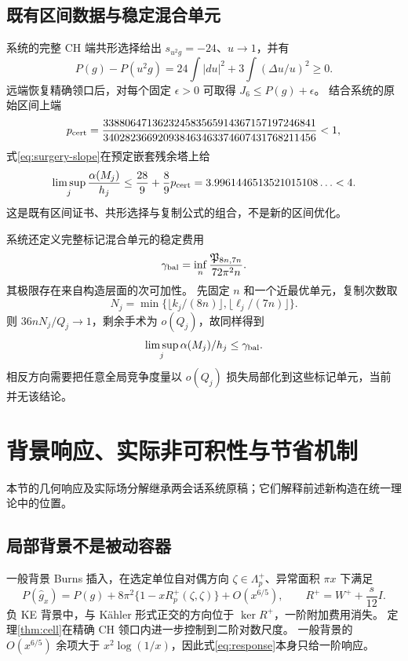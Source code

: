 \documentclass[UTF8,11pt,a4paper,fontset=none]{ctexart}
\numberwithin{equation}{section}
\theoremstyle{definition}
\theoremstyle{remark}\newtheorem{remark}[theorem]{说明}
\begin{document}
\subsection{既有区间数据与稳定混合单元}
系统的完整 CH 端共形选择\cite{Conformal}给出 $s_{u^2g}=-24$、$u\to1$，并有
\[
P(g)-P(u^2g)=24\int|du|^2+3\int(\Delta u/u)^2\ge0.
\]
远端恢复精确领口后，对每个固定 $\epsilon>0$ 可取得 $J_6\le P(g)+\epsilon$。
结合系统的原始区间上端
\[
p_{\rm cert}=
\frac{338806471362324583565914367157197246841}
{340282366920938463463374607431768211456}<1,
\]
式\eqref{eq:surgery-slope}在预定嵌套残余塔上给
\begin{equation}\label{eq:numeric}
\limsup_j\frac{\alpha(M_j)}{h_j}
\le\frac{28}{9}+\frac89p_{\rm cert}
=3.9961446513521015108\ldots<4.
\end{equation}
这是既有区间证书、共形选择与复制公式的组合，不是新的区间优化。

系统还定义完整标记混合单元的稳定费用\cite{CellSource}
\[
\gamma_{\rm bal}=\inf_n\frac{\mathfrak P_{8n,7n}}{72\pi^2n}.
\]
其极限存在来自构造层面的次可加性。
先固定 $n$ 和一个近最优单元，复制次数取
\[N_j=\min\{\lfloor k_j/(8n)\rfloor,\lfloor\ell_j/(7n)\rfloor\}.\]
则 $36nN_j/Q_j\to1$，剩余手术为 $o(Q_j)$，故同样得到
\begin{equation}\label{eq:stable-cell}
\limsup_j\alpha(M_j)/h_j\le\gamma_{\rm bal}.
\end{equation}
相反方向需要把任意全局竞争度量以 $o(Q_j)$ 损失局部化到这些标记单元，当前并无该结论。

\section{背景响应、实际非可积性与节省机制}\label{sec:saving}

本节的几何响应及实际场分解继承两会话系统原稿\cite{System,Field}；它们解释前述新构造在统一理论中的位置。

\subsection{局部背景不是被动容器}
一般背景 Burns 插入，在选定单位自对偶方向 $\zeta\in\Lambda_p^+$、异常面积 $\pi x$ 下满足
\begin{equation}\label{eq:response}
P(\widehat g_x)=P(g)+8\pi^2\{1-xR_p^+(\zeta,\zeta)\}+O(x^{6/5}),
\qquad R^+=W^++\frac{s}{12}I.
\end{equation}
负 KE 背景中，与 Kähler 形式正交的方向位于 $\ker R^+$，一阶附加费用消失。
定理\ref{thm:cell}在精确 CH 领口内进一步控制到二阶对数尺度。
一般背景的 $O(x^{6/5})$ 余项大于 $x^2\log(1/x)$，因此式\eqref{eq:response}本身只给一阶响应。
\end{document}
